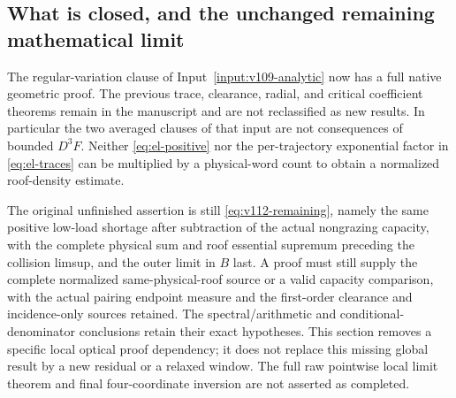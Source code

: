 \subsection{What is closed, and the unchanged remaining mathematical limit}
The regular-variation clause of Input~\ref{input:v109-analytic} now has
a full native geometric proof. The previous trace, clearance, radial,
and critical coefficient theorems remain in the manuscript and are not
reclassified as new results. In particular the two averaged clauses
of that input are not consequences of bounded $D^3F$. Neither
\eqref{eq:el-positive} nor the per-trajectory exponential factor in
\eqref{eq:el-traces} can be multiplied by a physical-word count to
obtain a normalized roof-density estimate.

The original unfinished assertion is still \eqref{eq:v112-remaining},
namely the same positive low-load shortage after subtraction of the
actual nongrazing capacity, with the complete physical sum and roof
essential supremum preceding the collision limsup, and the outer
limit in $B$ last. A proof must still supply the complete normalized
same-physical-roof source or a valid capacity comparison, with the
actual pairing endpoint measure and the first-order clearance and
incidence-only sources retained. The spectral/arithmetic and
conditional-denominator conclusions retain their exact hypotheses.
This section removes a specific local optical proof dependency; it does
not replace this missing global result by a new residual or a relaxed
window. The full raw pointwise local limit theorem and final
four-coordinate inversion are not asserted as completed.
